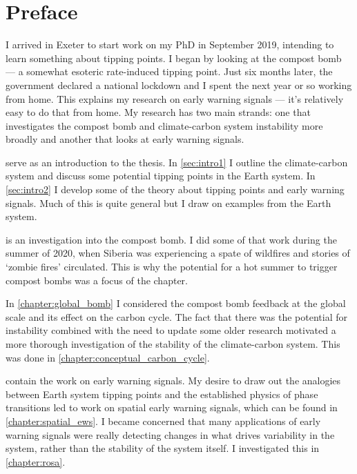 \chapter{Preface}

I arrived in Exeter to start work on my PhD in September 2019, intending to learn something about tipping points. I began by looking at the compost
bomb --- a somewhat esoteric rate-induced tipping point. Just six months later, the government declared a national lockdown
and I spent the next year or so working from home. This explains my research on early warning signals --- it's relatively easy to
do that from home. My research has two main strands: one that investigates the compost bomb and climate-carbon system instability more broadly
and another that looks at early warning signals.

 serve as an introduction to the thesis. In \cref{sec:intro1} I outline the climate-carbon system and discuss some potential
tipping points in the Earth system. In \cref{sec:intro2} I develop some of the theory about tipping points and early warning signals. Much of this is
quite general but I draw on examples from the Earth system.

 is an investigation into the compost bomb. I did some of that work during the summer of 2020, when Siberia
was experiencing a spate of wildfires and stories of `zombie fires' circulated. This is why the potential for a hot summer to trigger compost bombs
was a focus of the chapter.

In \cref{chapter:global_bomb} I considered the compost bomb feedback at the global scale and its effect on the carbon cycle.
The fact that there was the potential for instability combined with the need to update some older research motivated a more thorough investigation of
the stability of the climate-carbon system. This was done in \cref{chapter:conceptual_carbon_cycle}.

 contain the work on early warning signals. My desire to draw out the analogies between Earth system
tipping points and the established physics of phase transitions led to work on spatial early warning signals, which can be found in \cref{chapter:spatial_ews}.
I became concerned that many applications of early warning signals were really detecting changes in what drives variability in the system, rather than the stability
of the system itself. I investigated this in \cref{chapter:rosa}.

